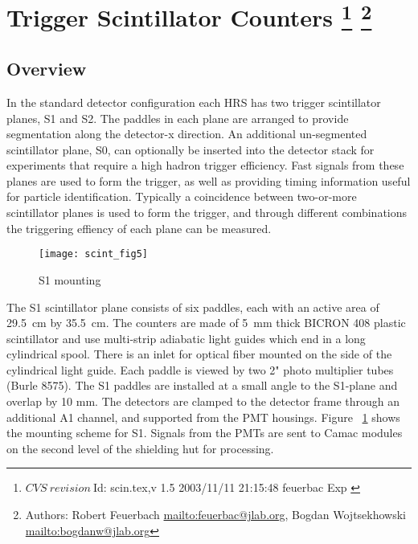 
\section[Trigger Scintillator Counters]{Trigger Scintillator Counters
  \footnote{
    $CVS~revision~ $Id: scin.tex,v 1.5 2003/11/11 21:15:48 feuerbac Exp $ $
  }
  \footnote{Authors: Robert Feuerbach \url{mailto:feuerbac@jlab.org},
    Bogdan Wojtsekhowski \url{mailto:bogdanw@jlab.org}}
}
\subsection{Overview}

\newcommand{\unit}[1]{\,\mbox{\ensuremath{\mathrm{#1}}}}

In the standard detector configuration each HRS has two trigger
scintillator planes, S1 and S2. The paddles in each plane are arranged to
provide segmentation along the detector-x direction. An additional
un-segmented scintillator plane, S0, can optionally be inserted into the
detector stack for experiments that require a high hadron trigger
efficiency. Fast signals from
these planes are used to form the trigger, as well as providing timing
information useful for particle identification.  Typically a coincidence between
two-or-more scintillator planes is used to form the trigger, and
through different combinations the triggering effiency of each plane can
be measured.

\begin{figure}[tbh]
  \begin{center}
    \texttt{[image: scint\_fig5]}
    \caption[Detectors: S1 Mounting]{S1 mounting}
    
    \label{fig:s1mount}
  \end{center}
\end{figure}
The S1 scintillator plane consists of six paddles, each with an active area
of 29.5~cm by 35.5~cm. The counters are made of 5~mm thick BICRON 408
plastic scintillator and use multi-strip adiabatic light guides which end
in a long cylindrical spool. There is an inlet for optical fiber mounted on
the side of the cylindrical light guide. Each paddle is viewed by two 2"
photo multiplier tubes (Burle 8575).  The S1 paddles are installed at a
small angle to the S1-plane and overlap by 10 mm.  The detectors are
clamped to the detector frame through an additional A1 channel, and
supported from the PMT housings. Figure ~\ref{fig:s1mount} shows the
mounting scheme for S1. Signals from the PMTs are sent to Camac modules on
the second level of the shielding hut for processing.


